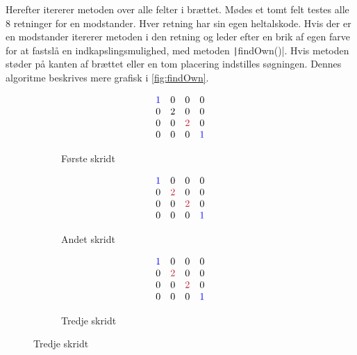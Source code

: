 Herefter itererer metoden over alle felter i brættet. Mødes et tomt felt testes alle 8 retninger for en modstander. Hver retning har sin egen heltalskode. Hvis der er en modstander itererer metoden i den retning og leder efter en brik af egen farve for at fastslå en indkapslingsmulighed, med metoden \texttt|findOwn()|. Hvis metoden støder på kanten af brættet eller en tom placering indstilles søgningen. Dennes algoritme beskrives mere grafisk i \cref{fig:findOwn}.
\begin{figure}[H]
    \centering
    \caption{\texttt|findOwn()| leder efter en indkapsling i nordvestlig retning (heltalskode 1).}\label{fig:findOwn}
    \begin{subfigure}[t]{.3\textwidth}
        \caption{Første skridt}
        \begin{align*}
            \begin{array}{cccc}
                \color{blue}1 & 0 & 0               & 0             \\
                0             & 2 & 0               & 0             \\
                0             & 0 & \color{DTUred}2 & 0             \\
                0             & 0 & 0               & \color{blue}1
            \end{array}
        \end{align*}
    \end{subfigure}
    \hfil
    \begin{subfigure}[t]{.3\textwidth}
        \caption{Andet skridt}
        \begin{align*}
            \begin{array}{cccc}
                \color{blue}1 & 0               & 0               & 0             \\
                0             & \color{DTUred}2 & 0               & 0             \\
                0             & 0               & \color{DTUred}2 & 0             \\
                0             & 0               & 0               & \color{blue}1
            \end{array}
        \end{align*}
    \end{subfigure}
    \hfil
    \begin{subfigure}[t]{.3\textwidth}
        \caption{Tredje skridt}
        \begin{align*}
            \begin{array}{cccc}
                \color{blue}1 & 0               & 0               & 0             \\
                0             & \color{DTUred}2 & 0               & 0             \\
                0             & 0               & \color{DTUred}2 & 0             \\
                0             & 0               & 0               & \color{blue}1
            \end{array}
        \end{align*}
    \end{subfigure}
\end{figure}
